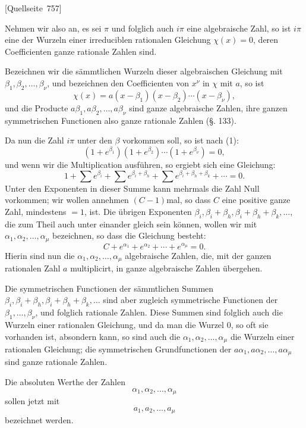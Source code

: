 \documentclass[11pt]{article}
\newcommand{\srcpage}[1]{\par\medskip\noindent\textsf{[Quellseite~#1]}\par\smallskip}
\begin{document}
\srcpage{757}
Nehmen wir also an, es sei $\pi$ und folglich auch $i\pi$ eine algebraische Zahl, so ist $i\pi$ eine der Wurzeln einer irreduciblen rationalen Gleichung $\chi(x)=0$, deren Coefficienten ganze rationale Zahlen sind.

Bezeichnen wir die sämmtlichen Wurzeln dieser algebraischen Gleichung mit $\beta_1,\beta_2,\ldots,\beta_\nu$, und bezeichnen den Coefficienten von $x^\nu$ in $\chi$ mit $a$, so ist
\begin{equation}\tag{2}
\chi(x)=a(x-\beta_1)(x-\beta_2)\cdots(x-\beta_\nu),
\end{equation}
und die Producte $a\beta_1,a\beta_2,\ldots,a\beta_\nu$ sind ganze algebraische Zahlen, ihre ganzen symmetrischen Functionen also ganze rationale Zahlen (§. 133).

Da nun die Zahl $i\pi$ unter den $\beta$ vorkommen soll, so ist nach (1):
\[
(1+e^{\beta_1})(1+e^{\beta_2})\cdots(1+e^{\beta_\nu})=0,
\]
und wenn wir die Multiplication ausführen, so ergiebt sich eine Gleichung:
\[
1+\sum e^{\beta_i}+\sum e^{\beta_i+\beta_h}
+\sum e^{\beta_i+\beta_h+\beta_k}+\cdots=0.
\]
Unter den Exponenten in dieser Summe kann mehrmals die Zahl Null vorkommen; wir wollen annehmen $(C-1)$mal, so dass $C$ eine positive ganze Zahl, mindestens $=1$, ist. Die übrigen Exponenten $\beta_i,\beta_i+\beta_h,\beta_i+\beta_h+\beta_k,\ldots$, die zum Theil auch unter einander gleich sein können, wollen wir mit $\alpha_1,\alpha_2,\ldots,\alpha_\mu$ bezeichnen, so dass die Gleichung besteht:
\begin{equation}\tag{3}
C+e^{\alpha_1}+e^{\alpha_2}+\cdots+e^{\alpha_\mu}=0.
\end{equation}
Hierin sind nun die $\alpha_1,\alpha_2,\ldots,\alpha_\mu$ algebraische Zahlen, die, mit der ganzen rationalen Zahl $a$ multiplicirt, in ganze algebraische Zahlen übergehen.

Die symmetrischen Functionen der sämmtlichen Summen $\beta_i,\beta_i+\beta_h,\beta_i+\beta_h+\beta_k,\ldots$ sind aber zugleich symmetrische Functionen der $\beta_1,\ldots,\beta_\nu$, und folglich rationale Zahlen. Diese Summen sind folglich auch die Wurzeln einer rationalen Gleichung, und da man die Wurzel 0, so oft sie vorhanden ist, absondern kann, so sind auch die $\alpha_1,\alpha_2,\ldots,\alpha_\mu$ die Wurzeln einer rationalen Gleichung; die symmetrischen Grundfunctionen der $a\alpha_1,a\alpha_2,\ldots,a\alpha_\mu$ sind ganze rationale Zahlen.

Die absoluten Werthe der Zahlen
\[
\alpha_1,\alpha_2,\ldots,\alpha_\mu
\]
sollen jetzt mit
\[
a_1,a_2,\ldots,a_\mu
\]
bezeichnet werden.
\end{document}
